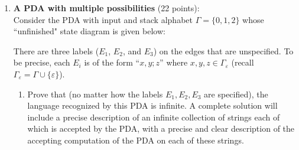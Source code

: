 \begin{enumerate} 

\item \textbf{A PDA with multiple possibilities} (22 points): \\
Consider the PDA with input and stack alphabet $\Gamma = \{0,1,2\}$ whose ``unfinished" 
state diagram is given below:

\begin{center}
\end{center}

There are three labels ($E_1$, $E_2$, and $E_3$) on the edges that are unspecified. 
To be precise, each $E_i$ is of the form ``$x,y; z$'' where $x, y, z \in \Gamma_{\varepsilon}$ 
(recall $\Gamma_{\varepsilon} = \Gamma \cup \{\varepsilon\}$).

\begin{enumerate}
    \item\gradeCorrectFirst Prove that (no matter how the labels $E_1, E_2, E_3$ are specified), 
    the language recognized by this 
    PDA is infinite. A complete solution will include a precise
    description of an infinite collection of strings each 
    of which is accepted by the PDA, with 
    a precise and
    clear description of the accepting computation of the PDA on 
    each of these strings.


\end{enumerate}
\end{enumerate}
